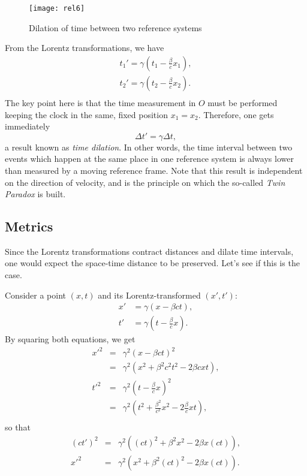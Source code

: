 \begin{figure}
  \centering
  \texttt{[image: rel6]}
  \caption{Dilation of time between two reference systems}
    \label{fig:rel6}
\end{figure}{}

From the Lorentz transformations, we have
\begin{align*}
    t_1' = \gamma\left(t_1-\frac{\beta}{c}x_1\right),\\
    t_2' = \gamma\left(t_2-\frac{\beta}{c}x_2\right).\\
\end{align*}
The key point here is that the time measurement in $O$ must be performed keeping the clock in the same, fixed position $x_1=x_2$. Therefore, one gets immediately
\begin{equation}
  \Delta t' = \gamma \Delta t,
\end{equation}
a result known as \emph{time dilation}. In other words, the time interval between two events which happen at the same place in one reference system is always lower than measured by a moving reference frame. Note that this result is independent on the direction of velocity, and is the principle on which the so-called \emph{Twin Paradox} is built.\\

\subsection{Metrics}
Since the Lorentz transformations contract distances and dilate time intervals, one would expect the space-time distance to be preserved. Let's see if this is the case.

Consider a point $(x,t)$ and its Lorentz-transformed $(x',t')$:
\begin{align*}
  x' &= \gamma \left(x-\beta c t\right),\\
  t' &= \gamma \left(t-\frac{\beta}{c} x\right).
\end{align*}
By squaring both equations, we get
\begin{eqnarray*}
  x'^2 &=& \gamma^2 \left(x-\beta c t\right)^2\\
  &=& \gamma^2 \left(x^2 + \beta^2c^2t^2 -2\beta c x t\right),\\
  t'^2 &=& \gamma^2 \left(t-\frac{\beta}{c} x\right)^2\\
  &=& \gamma^2 \left(t^2+\frac{\beta^2}{c^2} x^2 -2\frac{\beta}{c}xt\right),\\
\end{eqnarray*}
so that
\begin{eqnarray*}
  (ct')^2&=& \gamma^2 \left((ct)^2+\beta^2 x^2 -2\beta x (ct)\right),\\
  x'^2  &=& \gamma^2 \left(x^2 + \beta^2(ct)^2 -2\beta x (ct)\right).\\
\end{eqnarray*}

